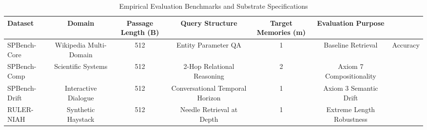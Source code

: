 \begin{table}
\caption{Empirical Evaluation Benchmarks and Substrate Specifications}
\label{tab:datasets}
\begin{tabular}{lccccc}
\toprule
Dataset & Domain & Passage Length (B) & Query Structure & Target Memories (m) & Evaluation Purpose \\
\midrule
SPBench-Core & Wikipedia Multi-Domain & 512 & Entity Parameter QA & 1 & Baseline Retrieval & Accuracy \\
SPBench-Comp & Scientific Systems & 512 & 2-Hop Relational Reasoning & 2 & Axiom 7 Compositionality \\
SPBench-Drift & Interactive Dialogue & 512 & Conversational Temporal Horizon & 1 & Axiom 3 Semantic Drift \\
RULER-NIAH & Synthetic Haystack & 512 & Needle Retrieval at Depth & 1 & Extreme Length Robustness \\
\bottomrule
\end{tabular}
\end{table}
